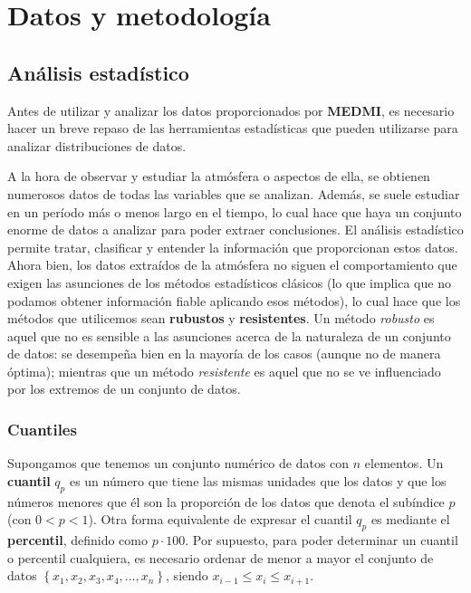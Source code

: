 \documentclass[12pt]{article}
\begin{document}
\newpage

\section{Datos y metodología}

\subsection{Análisis estadístico}

Antes de utilizar y analizar los datos proporcionados por \textbf{MEDMI}, es necesario hacer un breve repaso de las herramientas estadísticas que pueden utilizarse para analizar distribuciones de datos.

A la hora de observar y estudiar la atmósfera o aspectos de ella, se obtienen numerosos datos de todas las variables que se analizan. Además, se suele estudiar en un período más o menos largo en el tiempo, lo cual hace que haya un conjunto enorme de datos a analizar para poder extraer conclusiones. El análisis estadístico permite tratar, clasificar y entender la información que proporcionan estos datos. Ahora bien, los datos extraídos de la atmósfera no siguen el comportamiento que exigen las asunciones de los métodos estadísticos clásicos (lo que implica que no podamos obtener información fiable aplicando esos métodos), lo cual hace que los métodos que utilicemos sean \textbf{rubustos} y \textbf{resistentes}. Un método \textit{robusto} es aquel que no es sensible a las asunciones acerca de la naturaleza de un conjunto de datos: se desempeña bien en la mayoría de los casos (aunque no de manera óptima); mientras que un método \textit{resistente} es aquel que no se ve influenciado por los extremos de un conjunto de datos.

\subsubsection{Cuantiles}

Supongamos que tenemos un conjunto numérico de datos con $n$ elementos. Un \textbf{cuantil} $q_{p}$ es un número que tiene las mismas unidades que los datos y que los números menores que él son la proporción de los datos que denota el subíndice $p$ (con $0 < p < 1$). Otra forma equivalente de expresar el cuantil $q_{p}$ es mediante el \textbf{percentil}, definido como $p \cdot 100$. Por supuesto, para poder determinar un cuantil o percentil cualquiera, es necesario ordenar de menor a mayor el conjunto de datos  $\left\lbrace x_{1}, x_{2}, x_{3}, x_{4}, ..., x_{n} \right\rbrace$, siendo $ x_{i - 1} \leq x_{i} \leq x_{i + 1}$.
\end{document}
